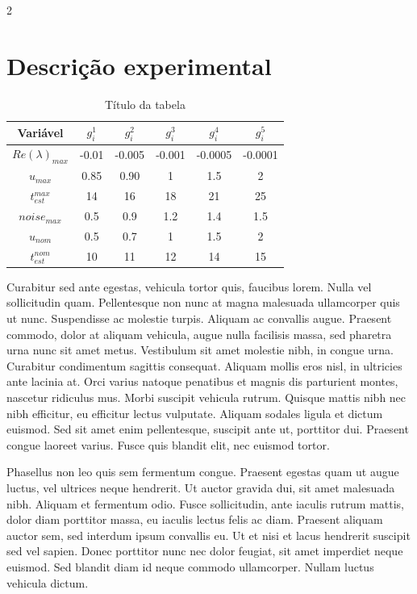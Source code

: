 \documentclass[twoside]{article}
\begin{document}
\begin{multicols}{2}
\section{Descrição experimental}




\begin{table}
\centering
\caption{Título da tabela}
\begin{tabular}{cc c c c c}
\hline
 Variável & $g_i^1$ & $g_i^2$ & $g_i^3$ & $g_i^4$ & $g_i^5$ \\
    \hline
$Re(\lambda)_{max}$ & -0.01  & -0.005 & -0.001 & -0.0005 & -0.0001 \\
$u_{max}$& 0.85 & 0.90 & 1 & 1.5 & 2  \\
$t_{est}^{max}$& 14 & 16 & 18 & 21 & 25 \\
$noise_{max}$& 0.5 & 0.9 & 1.2 & 1.4 & 1.5  \\
$u_{nom}$& 0.5 & 0.7 & 1  & 1.5 & 2  \\
$t_{est}^{nom}$& 10 & 11 & 12 & 14 & 15 \\
\hline
  \end{tabular}
\end{table}

Curabitur sed ante egestas, vehicula tortor quis, faucibus lorem. Nulla vel sollicitudin quam. Pellentesque non nunc at magna malesuada ullamcorper quis ut nunc. Suspendisse ac molestie turpis. Aliquam ac convallis augue. Praesent commodo, dolor at aliquam vehicula, augue nulla facilisis massa, sed pharetra urna nunc sit amet metus. Vestibulum sit amet molestie nibh, in congue urna. Curabitur condimentum sagittis consequat. Aliquam mollis eros nisl, in ultricies ante lacinia at. Orci varius natoque penatibus et magnis dis parturient montes, nascetur ridiculus mus. Morbi suscipit vehicula rutrum. Quisque mattis nibh nec nibh efficitur, eu efficitur lectus vulputate. Aliquam sodales ligula et dictum euismod. Sed sit amet enim pellentesque, suscipit ante ut, porttitor dui. Praesent congue laoreet varius. Fusce quis blandit elit, nec euismod tortor.

Phasellus non leo quis sem fermentum congue. Praesent egestas quam ut augue luctus, vel ultrices neque hendrerit. Ut auctor gravida dui, sit amet malesuada nibh. Aliquam et fermentum odio. Fusce sollicitudin, ante iaculis rutrum mattis, dolor diam porttitor massa, eu iaculis lectus felis ac diam. Praesent aliquam auctor sem, sed interdum ipsum convallis eu. Ut et nisi et lacus hendrerit suscipit sed vel sapien. Donec porttitor nunc nec dolor feugiat, sit amet imperdiet neque euismod. Sed blandit diam id neque commodo ullamcorper. Nullam luctus vehicula dictum.


\end{multicols}
\end{document}
